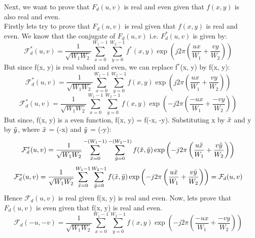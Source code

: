 \documentclass{article}
\begin{document}
\begin{enumerate}
Next, we want to prove that \(F_d(u, v)\) is real and even given that \(f(x, y)\) is also real and even. \\
Firstly lets try to prove that \(F_d(u, v)\) is real given that \(f(x, y)\) is real and even. We know that the conjugate of \(F_d(u, v)\) i.e. \(F_d^*(u, v)\) is given by: \\
\begin{equation}
    \mathcal{F}_d^*(u, v) = \frac{1}{\sqrt{W_1 W_2}} \sum_{x=0}^{W_1-1} \sum_{y=0}^{W_2-1} f^*(x, y) \exp \left(j 2 \pi \left( \frac{ux}{W_1} + \frac{vy}{W_2} \right) \right)
\end{equation}
But since f(x, y) is real valued and even, we can replace f$^*$(x, y) by f(x, y):
\begin{equation}
    \mathcal{F}_d^*(u, v) = \frac{1}{\sqrt{W_1 W_2}} \sum_{x=0}^{W_1-1} \sum_{y=0}^{W_2-1} f(x, y) \exp \left(j 2 \pi \left( \frac{ux}{W_1} + \frac{vy}{W_2} \right) \right)
\end{equation}
\begin{equation}
    \mathcal{F}_d^*(u, v) = \frac{1}{\sqrt{W_1 W_2}} \sum_{x=0}^{W_1-1} \sum_{y=0}^{W_2-1} f(x, y) \exp \left(-j 2 \pi \left( \frac{-ux}{W_1} + \frac{-vy}{W_2} \right) \right)
\end{equation}
But since, f(x, y) is a even function, f(x, y) = f(-x, -y). Substituting x by $\Tilde{x}$ and y by $\Tilde{y}$, where $\Tilde{x}$ = (-x) and $\Tilde{y}$ = (-y):
\begin{equation}
    \mathcal{F}_d^*(u, v) = \frac{1}{\sqrt{W_1 W_2}} \sum_{\Tilde{x}=0}^{-(W_1-1)} \sum_{\Tilde{y}=0}^{-(W_2-1)} f(\Tilde{x}, \Tilde{y}) \exp \left(-j 2 \pi \left( \frac{u\Tilde{x}}{W_1} + \frac{v\Tilde{y}}{W_2} \right) \right)
\end{equation}
\begin{equation}
    \mathcal{F}_d^*(u, v) = \frac{1}{\sqrt{W_1 W_2}} \sum_{\Tilde{x}=0}^{W_1-1} \sum_{\Tilde{y}=0}^{W_2-1} f(\Tilde{x}, \Tilde{y}) \exp \left(-j 2 \pi \left( \frac{u\Tilde{x}}{W_1} + \frac{v\Tilde{y}}{W_2} \right) \right) = \mathcal{F}_d(u, v)
\end{equation}
Hence $\mathcal{F}_d(u, v)$ is real given f(x, y) is real and even.
\newpage
Now, lets prove that $F_d(u, v)$ is even given that f(x, y) is real and even.
\begin{equation}
    \mathcal{F}_d(-u, -v) = \frac{1}{\sqrt{W_1 W_2}} \sum_{x=0}^{W_1-1} \sum_{y=0}^{W_2-1} f(x, y) \exp \left(-j 2 \pi \left( \frac{-ux}{W_1} + \frac{-vy}{W_2} \right) \right)
\end{equation}

\end{enumerate}
\end{document}
